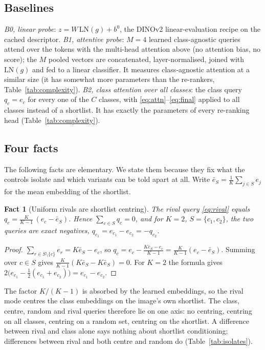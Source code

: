 \documentclass[11pt,a4paper]{article}
\theoremstyle{plain}
\newtheorem{fact}{Fact}
\newcommand{\LN}{\mathrm{LN}}
\newcommand{\eS}{\bar e_S}
\begin{document}
\subsection{Baselines}\label{sec:baselines}
\emph{B0, linear probe}: $z=W\,\LN(g)+b^0$, the DINOv2 linear-evaluation recipe on the cached descriptor.
\emph{B1, attentive probe}: $M=4$ learned class-agnostic queries attend over the tokens with the multi-head
attention above (no attention bias, no score); the $M$ pooled vectors are concatenated, layer-normalised, joined with
$\LN(g)$ and fed to a linear classifier. It measures class-agnostic attention at a similar size (it has somewhat more
parameters than the re-rankers, Table~\ref{tab:complexity}).
\emph{B2, class attention over all classes}: the class query $q_c=e_c$ for every one of the $C$ classes, with
\eqref{eq:attn}--\eqref{eq:final} applied to all classes instead of a shortlist. It has exactly the parameters of
every re-ranking head (Table~\ref{tab:complexity}).

\subsection{Four facts}\label{sec:facts}
The following facts are elementary. We state them because they fix what the controls isolate and which variants
can be told apart at all. Write $\eS=\frac1K\sum_{j\in S}e_j$ for the mean embedding of the shortlist.

\begin{fact}[Uniform rivals are shortlist centring]\label{fact:centring}
The rival query \eqref{eq:rival} equals $q_c=\frac{K}{K-1}\,(e_c-\eS)$. Hence $\sum_{c\in S}q_c=0$, and for $K=2$,
$S=\{c_1,c_2\}$, the two queries are exact negatives, $q_{c_1}=e_{c_1}-e_{c_2}=-q_{c_2}$.
\end{fact}
\begin{proof}
$\sum_{r\in S\setminus\{c\}}e_r=K\eS-e_c$, so $q_c=e_c-\frac{K\eS-e_c}{K-1}=\frac{K}{K-1}(e_c-\eS)$. Summing over
$c\in S$ gives $\frac{K}{K-1}(K\eS-K\eS)=0$. For $K=2$ the formula gives
$2\bigl(e_{c_1}-\frac12(e_{c_1}+e_{c_2})\bigr)=e_{c_1}-e_{c_2}$.
\end{proof}
The factor $K/(K-1)$ is absorbed by the learned embeddings, so the rival mode centres the class embeddings on the
image's own shortlist. The class, centre, random and rival queries therefore lie on one axis: no centring, centring
on all classes, centring on a random set, centring on the shortlist. A difference between rival and class alone says
nothing about shortlist conditioning; differences between rival and both centre and random do
(Table~\ref{tab:isolates}).
\end{document}
